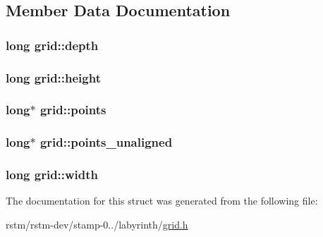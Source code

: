 \subsection{Member Data Documentation}
\hypertarget{structgrid_a4d2ef93090027bdcd9a94696d9bef170}{
\subsubsection[{depth}]{\setlength{\rightskip}{0pt plus 5cm}long grid\-::depth}}\label{structgrid_a4d2ef93090027bdcd9a94696d9bef170}
\hypertarget{structgrid_a8ac604080756327df4a307c415579b30}{
\subsubsection[{height}]{\setlength{\rightskip}{0pt plus 5cm}long grid\-::height}}\label{structgrid_a8ac604080756327df4a307c415579b30}
\hypertarget{structgrid_aaec1cc6b0a39b6204504d4e0697c86a7}{
\subsubsection[{points}]{\setlength{\rightskip}{0pt plus 5cm}long$\ast$ grid\-::points}}\label{structgrid_aaec1cc6b0a39b6204504d4e0697c86a7}
\hypertarget{structgrid_a8cf609c0548a10723073c2c63094dc14}{
\subsubsection[{points\-\_\-unaligned}]{\setlength{\rightskip}{0pt plus 5cm}long$\ast$ grid\-::points\-\_\-unaligned}}\label{structgrid_a8cf609c0548a10723073c2c63094dc14}
\hypertarget{structgrid_a0cc93c07249aa37a9453f54f479c0549}{
\subsubsection[{width}]{\setlength{\rightskip}{0pt plus 5cm}long grid\-::width}}\label{structgrid_a0cc93c07249aa37a9453f54f479c0549}


The documentation for this struct was generated from the following file\-:\begin{DoxyCompactItemize}
\item 
rstm/rstm-\/dev/stamp-\/0../labyrinth/\hyperlink{grid_8h}{grid.\-h}\end{DoxyCompactItemize}
